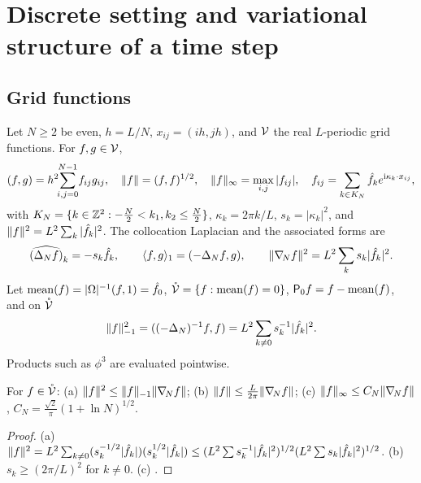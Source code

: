 \section{Discrete setting and variational structure of a time step}\label{sec:scheme}

\subsection{Grid functions}
Let $N\ge2$ be even, $h=L/N$, $x_{ij}=(ih,jh)$, and $\mathcal{V}$ the real $L$-periodic grid functions. For $f,g\in\mathcal{V}$,
\[
(f,g)=h^2\!\!\sum_{i,j=0}^{N-1}\!f_{ij}g_{ij},\quad \lVert f\rVert=(f,f)^{1/2},\quad \lVert f\rVert_\infty=\max_{i,j}|f_{ij}|,\quad f_{ij}=\sum_{k\in K_N}\hat f_ke^{\mathrm i\kappa_k\cdot x_{ij}},
\]
with $K_N=\{k\in\mathbb{Z}^2:-\frac N2<k_1,k_2\le\frac N2\}$, $\kappa_k=2\pi k/L$, $s_k=|\kappa_k|^2$, and $\lVert f\rVert^2=L^2\sum_k|\hat f_k|^2$. The collocation Laplacian and the associated forms are
\begin{equation}\label{eq:lapN}
\widehat{(\Delta_N f)}_k=-s_k\hat f_k,\qquad \langle f,g\rangle_1=(-\Delta_N f,g),\qquad \lVert \nabla_{\!N} f\rVert^2=L^2\sum_ks_k|\hat f_k|^2 .
\end{equation}
Let $\operatorname{mean}(f)=|\Omega|^{-1}(f,1)=\hat f_0$, $\mathring{\mathcal{V}}=\{f:\operatorname{mean}(f)=0\}$, $\mathsf{P}_0 f=f-\operatorname{mean}(f)$, and on $\mathring{\mathcal{V}}$
\begin{equation}\label{eq:hm1}
\lVert f\rVert_{-1}^2=((-\Delta_N)^{-1}f,f)=L^2\sum_{k\ne0}s_k^{-1}|\hat f_k|^2 .
\end{equation}
Products such as $\phi^3$ are evaluated pointwise.

\begin{lemma}\label{lem:discrete}
For $f\in\mathring{\mathcal{V}}$: {\rm(a)} $\lVert f\rVert^2\le\lVert f\rVert_{-1}\lVert \nabla_{\!N} f\rVert$; {\rm(b)} $\lVert f\rVert\le\frac L{2\pi}\lVert \nabla_{\!N} f\rVert$; {\rm(c)} $\lVert f\rVert_\infty\le C_N\lVert \nabla_{\!N} f\rVert$, $C_N=\frac{\sqrt2}{\pi}(1+\ln N)^{1/2}$.
\end{lemma}

\begin{proof}
(a) $\lVert f\rVert^2=L^2\sum_{k\ne0}(s_k^{-1/2}|\hat f_k|)(s_k^{1/2}|\hat f_k|)\le(L^2\sum s_k^{-1}|\hat f_k|^2)^{1/2}(L^2\sum s_k|\hat f_k|^2)^{1/2}$. (b) $s_k\ge(2\pi/L)^2$ for $k\ne0$. (c) .
\end{proof}

